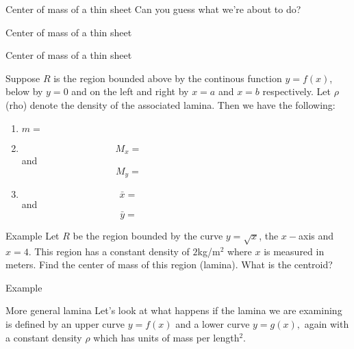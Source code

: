 \documentclass[presentation]{beamer}
\begin{document}
\begin{frame}[label={sec:org0be95b2}]{Center of mass of a thin sheet}
Can you guess what we're about to do?
\vspace{10in}
\end{frame}

\begin{frame}[label={sec:orgaec5de9}]{Center of mass of a thin sheet}
\end{frame}

\begin{frame}[label={sec:org6551e07}]{Center of mass of a thin sheet}
\begin{theorem}
Suppose \(R\) is the region bounded above by the continous function
\(y = f(x)\), below by \(y = 0\) and on the left and right by \(x =
a\) and \(x = b\) respectively. Let \(\rho\) (rho) denote the density of the associated lamina.  Then we have the following:

\begin{enumerate}
\item \(m = \hspace{2in}\)
\item \[M_x = \hspace{2in}\] and \[M_y = \hspace{2in}\]
\item \[\bar{x} = \hspace{2in}\] and \[\bar{y} = \hspace{2in}\]
\end{enumerate}
\end{theorem}

\vspace{10in}
\end{frame}

\begin{frame}[label={sec:org00a1ff9}]{Example}
Let \(R\) be the region bounded by the curve \(y=\sqrt{x}\), the
\(x-\)axis and \(x=4\).  This region has a constant density of \(2\)kg/m\(^2\) where \(x\) is measured in meters.  Find the center of mass of
this region (lamina).  What is the centroid?
\vspace{10in}
\end{frame}

\begin{frame}[label={sec:orga1e1c79}]{Example}
\end{frame}

\begin{frame}[label={sec:org5a99fa1}]{More general lamina}
Let's look at what happens if the lamina we are examining is defined
by an upper curve \(y = f(x)\) and a lower curve \(y = g(x),\) again
with a constant density \(\rho\) which has units of mass per
length\(^2\).
\vspace{10in}
\end{frame}
\end{document}
